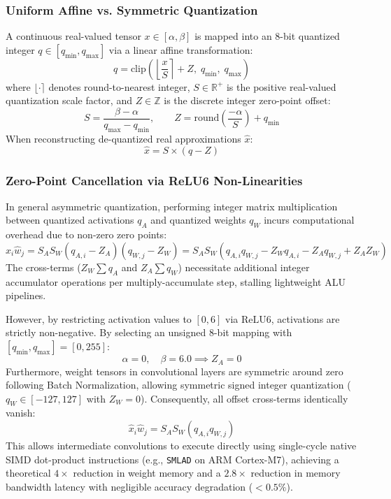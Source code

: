 \documentclass[11pt,a4paper]{article}
\begin{document}
\subsubsection{Uniform Affine vs. Symmetric Quantization}
A continuous real-valued tensor $x \in [\alpha, \beta]$ is mapped into an 8-bit quantized integer $q \in [q_{\min}, q_{\max}]$ via a linear affine transformation:
\begin{equation}
  q = \text{clip}\left( \left\lfloor \frac{x}{S} \right\rceil + Z, \; q_{\min}, \; q_{\max} \right)
\end{equation}
where $\lfloor \cdot \rceil$ denotes round-to-nearest integer, $S \in \mathbb{R}^+$ is the positive real-valued quantization scale factor, and $Z \in \mathbb{Z}$ is the discrete integer zero-point offset:
\begin{equation}
  S = \frac{\beta - \alpha}{q_{\max} - q_{\min}}, \qquad Z = \text{round}\left( \frac{-\alpha}{S} \right) + q_{\min}
\end{equation}
When reconstructing de-quantized real approximations $\hat{x}$:
\begin{equation}
  \hat{x} = S \times (q - Z)
\end{equation}

\subsubsection{Zero-Point Cancellation via ReLU6 Non-Linearities}
In general asymmetric quantization, performing integer matrix multiplication between quantized activations $q_A$ and quantized weights $q_W$ incurs computational overhead due to non-zero zero points:
\begin{equation}
  \hat{x}_i \hat{w}_j = S_A S_W (q_{A, i} - Z_A)(q_{W, j} - Z_W) = S_A S_W \left( q_{A, i} q_{W, j} - Z_W q_{A, i} - Z_A q_{W, j} + Z_A Z_W \right)
\end{equation}
The cross-terms ($Z_W \sum q_A$ and $Z_A \sum q_W$) necessitate additional integer accumulator operations per multiply-accumulate step, stalling lightweight ALU pipelines.

However, by restricting activation values to $[0, 6]$ via $\text{ReLU6}$, activations are strictly non-negative. By selecting an unsigned 8-bit mapping with $[q_{\min}, q_{\max}] = [0, 255]$:
\begin{equation}
  \alpha = 0, \quad \beta = 6.0 \implies Z_A = 0
\end{equation}
Furthermore, weight tensors in convolutional layers are symmetric around zero following Batch Normalization, allowing symmetric signed integer quantization ($q_W \in [-127, 127]$ with $Z_W = 0$). Consequently, all offset cross-terms identically vanish:
\begin{equation}
  \hat{x}_i \hat{w}_j = S_A S_W \left( q_{A, i} q_{W, j} \right)
\end{equation}
This allows intermediate convolutions to execute directly using single-cycle native SIMD dot-product instructions (e.g., \texttt{SMLAD} on ARM Cortex-M7), achieving a theoretical $4\times$ reduction in weight memory and a $2.8\times$ reduction in memory bandwidth latency with negligible accuracy degradation ($<0.5\%$).
\end{document}
